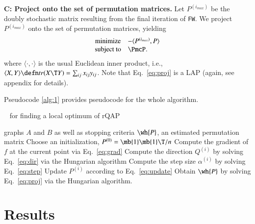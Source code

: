 \documentclass[preprint,11pt]{elsarticle}
\begin{document}
\textbf{C: Project onto the set of permutation matrices.}   Let $P^{(i_{max})}$ be the doubly stochastic matrix resulting from the final iteration of \texttt{FW}.  We project $P^{(i_{max})}$ onto the set of permutation matrices, yielding
\begin{equation}
\begin{array}{cl}
			\text{minimize}   & -\langle P^{(i_{max})}, P \rangle \\
			\text{subject to}  & \PmcP.   
\end{array} \label{eq:proj}
\end{equation}
where $\langle \cdot,\cdot \rangle$ %
is the usual Euclidean inner product, i.e., $\langle X,Y\rangle \defn tr(X\T Y)= \sum_{ij} x_{ij} y_{ij}$.  Note that Eq.~\eqref{eq:proj} is a LAP (again, see appendix for details).


Pseudocode \ref{alg:1} provides pseudocode for the whole algorithm.  

\begin{algorithm}
	\caption{\FAQ~ for finding a local optimum of rQAP} \label{alg:1}
\begin{algorithmic}[1]
	\REQUIRE graphs $A$ and $B$ as well as stopping criteria
	\ENSURE $\wh{P}$, an estimated permutation matrix
	\STATE Choose an initialization, $P^{(0)}=\mb{1}\mb{1}\T/n$ \label{step:init} %
	\STATE Compute the gradient of $f$ at the current point via Eq.~\eqref{eq:grad}	
	\STATE Compute the direction $Q^{(i)}$ by solving Eq.~\eqref{eq:dir} via the Hungarian algorithm
	\STATE Compute the step size $\alpha^{(i)}$ by solving Eq.~\eqref{eq:step}
	\STATE Update $P^{(i)}$ according to Eq.~\eqref{eq:update}  %
	\ENDWHILE
	\STATE Obtain $\wh{P}$ by solving Eq.~\eqref{eq:proj} via the Hungarian algorithm.
\end{algorithmic}
\end{algorithm}



\section{Results} %
\label{sec:results}
\end{document}
